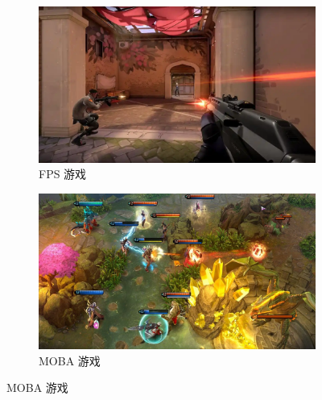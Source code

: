\begin{figure}[ht]
\centering
\begin{subfigure}[t]{0.4\linewidth}
  \centering
  \includegraphics[width=\linewidth]{figures/chap03/game_example/fps_game.png}
  \caption{FPS 游戏}
  \label{fig-fps-game}
\end{subfigure}%
\begin{subfigure}[t]{0.4\linewidth}
  \centering
  \includegraphics[width=\linewidth]{figures/chap03/game_example/moba_game.png}
  \caption{MOBA 游戏}
  \label{fig-moba-game}
\end{subfigure}


\end{figure}

